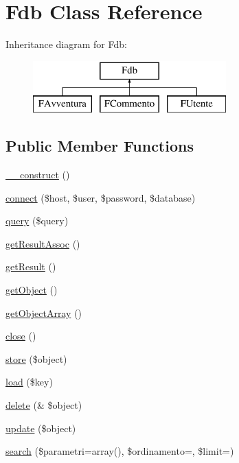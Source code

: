 \hypertarget{class_fdb}{}\section{Fdb Class Reference}
\label{class_fdb}
Inheritance diagram for Fdb\+:\begin{figure}[H]
\begin{center}
\leavevmode
\includegraphics[height=2.000000cm]{class_fdb}
\end{center}
\end{figure}
\subsection*{Public Member Functions}
\begin{DoxyCompactItemize}
\item 
\mbox{\hyperlink{class_fdb_a095c5d389db211932136b53f25f39685}{\+\_\+\+\_\+construct}} ()
\item 
\mbox{\hyperlink{class_fdb_afbc5dcb1ce78ec5dabf3d70cffbd9da7}{connect}} (\$host, \$user, \$password, \$database)
\item 
\mbox{\hyperlink{class_fdb_afbf3cf8f76801c717232f8a723bac177}{query}} (\$query)
\item 
\mbox{\hyperlink{class_fdb_a3c1f4f1ffa871d0097a114a99771de35}{get\+Result\+Assoc}} ()
\item 
\mbox{\hyperlink{class_fdb_ae077eb8a032a325ceb939bfabfa5f472}{get\+Result}} ()
\item 
\mbox{\hyperlink{class_fdb_a8ecaa7401cc1e1144cb98698a9658ebc}{get\+Object}} ()
\item 
\mbox{\hyperlink{class_fdb_a8c905ea0a0d60236497a91479c04c21a}{get\+Object\+Array}} ()
\item 
\mbox{\hyperlink{class_fdb_aa69c8bf1f1dcf4e72552efff1fe3e87e}{close}} ()
\item 
\mbox{\hyperlink{class_fdb_a6221a0139063da1d2b1fa70d1d1fbe9c}{store}} (\$object)
\item 
\mbox{\hyperlink{class_fdb_a8d0a51036af71436a1e8dcc26fc4281d}{load}} (\$key)
\item 
\mbox{\hyperlink{class_fdb_a7cd3a048e7e410beed8ccc3f1bf597f5}{delete}} (\& \$object)
\item 
\mbox{\hyperlink{class_fdb_ab745d0b824e697c1e13747e68eed9fff}{update}} (\$object)
\item 
\mbox{\hyperlink{class_fdb_a2fd225ebf3ec2f40d21ff95249b031b9}{search}} (\$parametri=array(), \$ordinamento=\textquotesingle{}\textquotesingle{}, \$limit=\textquotesingle{}\textquotesingle{})
\end{DoxyCompactItemize}
